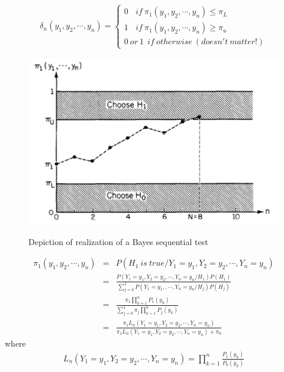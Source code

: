 \documentclass[12pt]{report}
\begin{document}
\begin{eqnarray}
\label{l10}
\delta_n(y_1,y_2,\cdots,y_n) =  
\begin{cases}
0 \ \ \ \ if \ \pi_1(y_1,y_2,\cdots,y_n)\leq\pi_L \\
1 \ \ \ \ if \ \pi_1(y_1,y_2,\cdots,y_n)\geq\pi_u \\
0 \ or \ 1 \ \ if \ otherwise\ (doesn't \ matter!)
\end{cases}
\end{eqnarray}


\begin{figure}
	\centering
	\includegraphics[scale=0.7]{Figures/bayesseqtest.png}\\
	\caption{Depiction of realization of a Bayes sequential test}
\end{figure}
\begin{eqnarray}
\pi_1(y_1,y_2,\cdots,y_n)&=&P(H_1 \ is \ true/Y_1=y_1,Y_2=y_2,\cdots, Y_n=y_n)\\
&=&\frac{P(Y_1=y_1,Y_2=y_2,\cdots, Y_n=y_n/H_1)P(H_1)}{\sum_{j=0}^{1}P(Y_1=y_1,,\cdots, Y_n=y_n/H_j)P(H_j)}\\
&=&\frac{\pi_1\prod_{k=1}^{n}P_1(y_k)}{\sum_{j=0}^{1}\pi_j\prod_{k=1}^{n}P_j(y_k)}\\
&=&\frac{\pi_1L_n(Y_1=y_1,Y_2=y_2,\cdots, Y_n=y_n)}{\pi_1L_n(Y_1=y_1,Y_2=y_2,\cdots, Y_n=y_n)+\pi_0}
\end{eqnarray}
where 
\begin{eqnarray}
L_n(Y_1=y_1,Y_2=y_2,\cdots, Y_n=y_n)=\prod_{k=1}^{n}\frac{P_1(y_k)}{P_0(y_k)}
\end{eqnarray}
\end{document}
